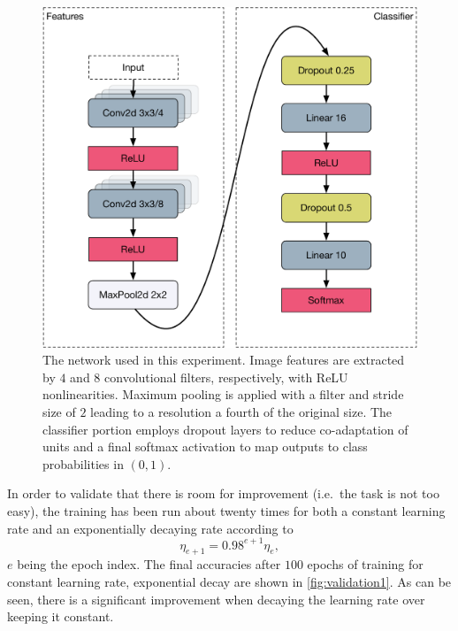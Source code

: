 \begin{figure}
    \centering
    \includegraphics[width=\linewidth]{gfx/diagrams/neural_network/alexnetmini.pdf}
    \caption[Simplified AlexNet architecture]{The network used in this
    experiment. Image features are extracted by $4$ and $8$ convolutional
    filters, respectively, with ReLU nonlinearities. Maximum pooling is applied
    with a filter and stride size of $2$ leading to a resolution a fourth of the
    original size. The classifier portion employs dropout layers to reduce
    co-adaptation of units and a final softmax activation to map outputs to
    class probabilities in $(0,1)$.}
    \label{fig:alexnetmini}
\end{figure}

In order to validate that there is room for improvement (i.e.~the task is not
too easy), the training has been
run about twenty times for both a constant learning rate and an exponentially
decaying rate according to
\begin{equation}
    \eta_{e+1}  = 0.98^{e+1} \eta_{e},
\end{equation}
$e$ being the epoch index.
The final accuracies after $100$ epochs of training for constant learning rate,
exponential decay are shown in \cref{fig:validation1}. As can be seen, there is
a significant improvement when decaying the learning rate over keeping it
constant.

